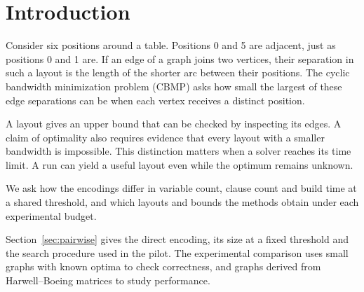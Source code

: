 \section{Introduction}
\label{sec:intro}

Consider six positions around a table. Positions 0 and 5 are adjacent, just
as positions 0 and 1 are. If an edge of a graph joins two vertices, their
separation in such a layout is the length of the shorter arc between their
positions. The cyclic bandwidth minimization problem (CBMP) asks how small
the largest of these edge separations can be when each vertex receives a
distinct position.

A layout gives an upper bound that can be checked by inspecting its edges.
A claim of optimality also requires evidence that every layout with a smaller
bandwidth is impossible. This distinction matters when a solver reaches its
time limit. A run can yield a useful layout even while the optimum remains
unknown.

We ask how the encodings differ in variable count, clause count and build
time at a shared threshold, and which layouts and bounds the methods obtain
under each experimental budget.

Section~\ref{sec:pairwise} gives the direct encoding, its size at a fixed
threshold and the search procedure used in the pilot. The experimental
comparison uses small graphs with known optima to check
correctness, and graphs derived from Harwell--Boeing matrices to study
performance.
